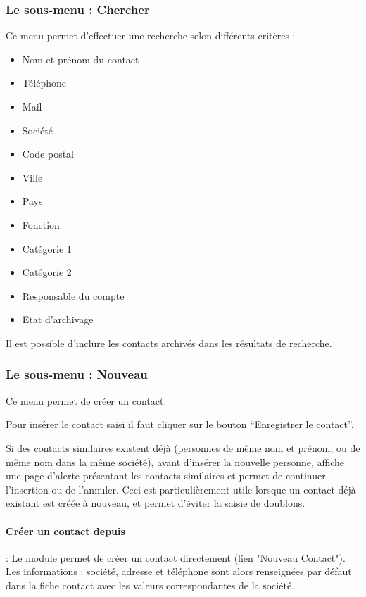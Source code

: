 \subsubsection{Le sous-menu : Chercher}

Ce menu permet d'effectuer une recherche selon différents critères :

\begin{itemize}
\item Nom et prénom du contact
\item Téléphone
\item Mail
\item Société
\item Code postal
\item Ville
\item Pays
\item Fonction
\item Catégorie 1
\item Catégorie 2
\item Responsable du compte
\item Etat d'archivage
\end{itemize}

Il est possible d'inclure les contacts archivés dans les résultats de recherche.


\subsubsection{Le sous-menu : Nouveau}

Ce menu permet de créer un contact.

Pour insérer le contact saisi il faut cliquer sur le bouton ``Enregistrer le contact''.

Si des contacts similaires existent déjà (personnes de même nom et prénom, ou de même nom dans la même société), avant d'insérer la nouvelle personne, \obm affiche une page d'alerte présentant les contacts similaires et permet de continuer l'insertion ou de l'annuler.
Ceci est particulièrement utile lorsque un contact déjà existant est créée à nouveau, et permet d'éviter la saisie de doublons.

\paragraph{Créer un contact depuis \company} : Le module \company permet de créer un contact directement (lien "Nouveau Contact").
Les informations : société, adresse et téléphone sont alors renseignées par défaut dans la fiche contact avec les valeurs correspondantes de la société.

